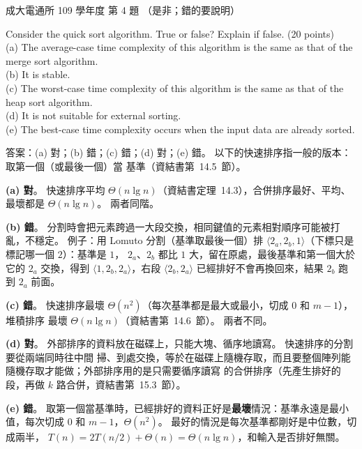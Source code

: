 \begin{pastexam}[label={px:ncku-109-comm-ds-04}]{成大電通所 109 學年度 第 4 題}
（是非；錯的要說明）

Consider the quick sort algorithm. True or false? Explain if false. (20 points)\\
(a) The average-case time complexity of this algorithm is the same as that of the merge sort
algorithm.\\
(b) It is stable.\\
(c) The worst-case time complexity of this algorithm is the same as that of the heap sort
algorithm.\\
(d) It is not suitable for external sorting.\\
(e) The best-case time complexity occurs when the input data are already sorted.
\end{pastexam}

\begin{pastsoln}
答案：(a) 對；(b) 錯；(c) 錯；(d) 對；(e) 錯。 以下的快速排序指一般的版本：取第一個（或最後一個）當
基準（資結書第~14.5~節）。

\textbf{(a) 對}。 快速排序平均 $\Theta(n \lg n)$（資結書定理~14.3），合併排序最好、平均、最壞都是
$\Theta(n \lg n)$。 兩者同階。

\textbf{(b) 錯}。 分割時會把元素跨過一大段交換，相同鍵值的元素相對順序可能被打亂，不穩定。 例子：用
Lomuto 分割（基準取最後一個）排 $\langle 2_a, 2_b, 1\rangle$（下標只是標記哪一個 $2$）：基準是 $1$，
$2_a$、$2_b$ 都比 $1$ 大，留在原處，最後基準和第一個大於它的 $2_a$ 交換，得到
$\langle 1, 2_b, 2_a\rangle$，右段 $\langle 2_b, 2_a\rangle$ 已經排好不會再換回來，結果 $2_b$ 跑到
$2_a$ 前面。

\textbf{(c) 錯}。 快速排序最壞 $\Theta(n^2)$（每次基準都是最大或最小，切成 $0$ 和 $m - 1$），堆積排序
最壞 $\Theta(n \lg n)$（資結書第~14.6~節）。 兩者不同。

\textbf{(d) 對}。 外部排序的資料放在磁碟上，只能大塊、循序地讀寫。 快速排序的分割要從兩端同時往中間
掃、到處交換，等於在磁碟上隨機存取，而且要整個陣列能隨機存取才能做；外部排序用的是只需要循序讀寫
的合併排序（先產生排好的段，再做 $k$ 路合併，資結書第~15.3~節）。

\textbf{(e) 錯}。 取第一個當基準時，已經排好的資料正好是\textbf{最壞}情況：基準永遠是最小值，每次切成
$0$ 和 $m - 1$，$\Theta(n^2)$。 最好的情況是每次基準都剛好是中位數，切成兩半，
$T(n) = 2T(n/2) + \Theta(n) = \Theta(n \lg n)$，和輸入是否排好無關。
\end{pastsoln}
